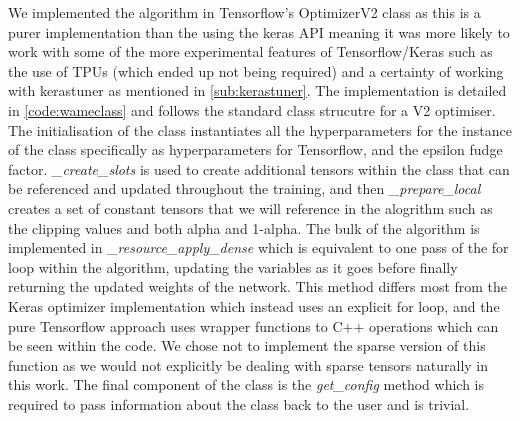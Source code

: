 \documentclass[12pt]{article}
\numberwithin{equation}{section}
\numberwithin{figure}{section}
\numberwithin{table}{section}
\begin{document}
We implemented the algorithm in Tensorflow's OptimizerV2 class \cite{Tensorflow} as this is a purer implementation than the using the keras API meaning it was more likely to work with some of the more experimental features of Tensorflow/Keras such as the use of TPUs (which ended up not being required) and a certainty of working with kerastuner as mentioned in \cref{sub:kerastuner}. The implementation is detailed in \cref{code:wameclass} and follows the standard class strucutre for a V2 optimiser. The initialisation of the class instantiates all the hyperparameters for the instance of the class specifically as hyperparameters for Tensorflow, and the epsilon fudge factor. \emph{\_create\_slots} is used to create additional tensors within the class that can be referenced and updated throughout the training, and then \emph{\_prepare\_local} creates a set of constant tensors that we will reference in the alogrithm such as the clipping values and both alpha and 1-alpha. The bulk of the algorithm is implemented in \emph{\_resource\_apply\_dense} which is equivalent to one pass of the for loop within the algorithm, updating the variables as it goes before finally returning the updated weights of the network. This method differs most from the Keras optimizer implementation which instead uses an explicit for loop, and the pure Tensorflow approach uses wrapper functions to C++ operations which can be seen within the code. We chose not to implement the sparse version of this function as we would not explicitly be dealing with sparse tensors naturally in this work. The final component of the class is the \emph{get\_config} method which is required to pass information about the class back to the user and is trivial.
\end{document}
